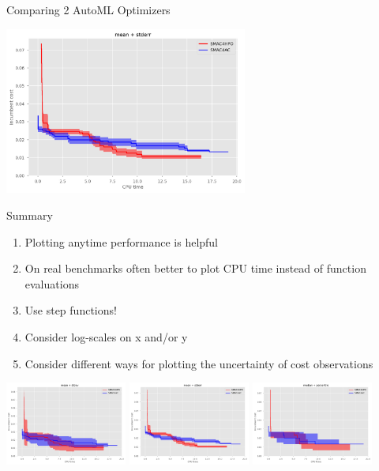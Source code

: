 \begin{frame}[c]{Comparing 2 AutoML Optimizers}
	
	\centering
	\includegraphics[width=0.6\textwidth]{plots/cpu_time/9_2_compare_mean_stderr.png}
	
\end{frame}



\begin{frame}[c]{Summary}
	
	\begin{enumerate}
		\item Plotting anytime performance is helpful
		\medskip
		\item On real benchmarks often better to plot CPU time instead of function evaluations
		\medskip
		\item Use step functions!
		\medskip
		\item Consider log-scales on x and/or y
		\medskip
		\item Consider different ways for plotting the uncertainty of cost observations 
	\end{enumerate}
	\bigskip
		\includegraphics[width=0.3\textwidth]{plots/cpu_time/9_1_compare_mean_stdev.png}
		\includegraphics[width=0.3\textwidth]{plots/cpu_time/9_2_compare_mean_stderr.png}
		\includegraphics[width=0.3\textwidth]{plots/cpu_time/9_3_compare_median_percentile.png}
	
\end{frame}




